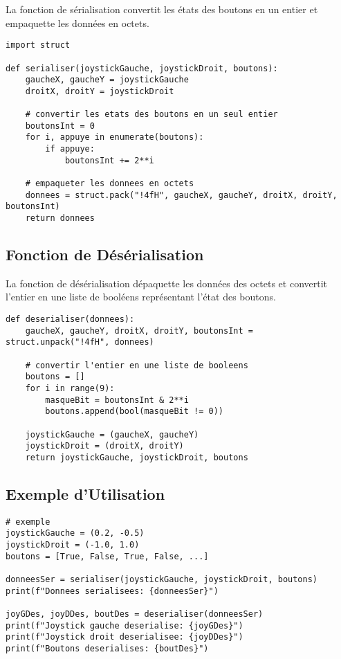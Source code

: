 \documentclass{article}
\begin{document}
La fonction de sérialisation convertit les états des boutons en un entier et empaquette les données en octets.

\begin{lstlisting}[caption=Fonction de Serialisation]
import struct

def serialiser(joystickGauche, joystickDroit, boutons):
    gaucheX, gaucheY = joystickGauche
    droitX, droitY = joystickDroit

    # convertir les etats des boutons en un seul entier
    boutonsInt = 0
    for i, appuye in enumerate(boutons):
        if appuye:
            boutonsInt += 2**i

    # empaqueter les donnees en octets
    donnees = struct.pack("!4fH", gaucheX, gaucheY, droitX, droitY, boutonsInt)
    return donnees
\end{lstlisting}

\subsection{Fonction de Désérialisation}

La fonction de désérialisation dépaquette les données des octets et convertit l'entier en une liste de booléens représentant l'état des boutons.

\begin{lstlisting}[caption=Fonction de Deserialisation]
def deserialiser(donnees):
    gaucheX, gaucheY, droitX, droitY, boutonsInt = struct.unpack("!4fH", donnees)

    # convertir l'entier en une liste de booleens
    boutons = []
    for i in range(9):
        masqueBit = boutonsInt & 2**i
        boutons.append(bool(masqueBit != 0))

    joystickGauche = (gaucheX, gaucheY)
    joystickDroit = (droitX, droitY)
    return joystickGauche, joystickDroit, boutons
\end{lstlisting}

\break\subsection{Exemple d'Utilisation}

\begin{lstlisting}[caption={Exemple d'Utilisation}]
# exemple
joystickGauche = (0.2, -0.5)
joystickDroit = (-1.0, 1.0)
boutons = [True, False, True, False, ...]

donneesSer = serialiser(joystickGauche, joystickDroit, boutons)
print(f"Donnees serialisees: {donneesSer}")

joyGDes, joyDDes, boutDes = deserialiser(donneesSer)
print(f"Joystick gauche deserialise: {joyGDes}")
print(f"Joystick droit deserialisee: {joyDDes}")
print(f"Boutons deserialises: {boutDes}")
\end{lstlisting}
\end{document}
